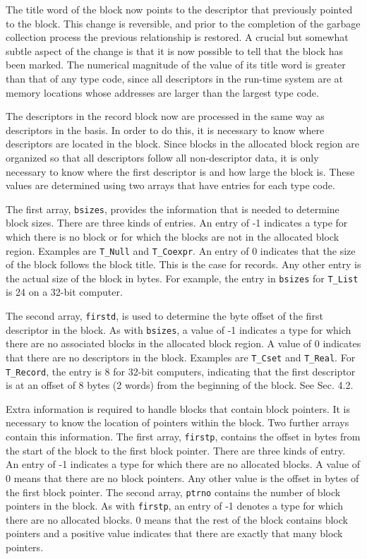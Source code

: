 The title word of the block now points to the descriptor that
previously pointed to the block. This change is reversible, and prior
to the completion of the garbage collection process the previous
relationship is restored. A crucial but somewhat subtle aspect of the
change is that it is now possible to tell that the block has been
marked. The numerical magnitude of the value of its title word is
greater than that of any type code, since all descriptors in the
run-time system are at memory locations whose addresses are larger
than the largest type code.

The descriptors in the record block now are processed in the same way
as descriptors in the basis. In order to do this, it is necessary to
know where descriptors are located in the block. Since blocks in the
allocated block region are organized so that all descriptors follow
all non-descriptor data, it is only necessary to know where the first
descriptor is and how large the block is. These values are determined
using two arrays that have entries for each type code.

The first array, \texttt{bsizes}, provides the information that is
needed to determine block sizes. There are three kinds of entries. An
entry of -1 indicates a type for which there is no block or for which
the blocks are not in the allocated block region. Examples are
\texttt{T\_Null} and \texttt{T\_Coexpr}. An entry of 0 indicates that
the size of the block follows the block title. This is the case for
records. Any other entry is the actual size of the block in bytes. For
example, the entry in \texttt{bsizes} for \texttt{T\_List} is 24 on a
32-bit computer.

The second array, \texttt{firstd}, is used to determine the byte
offset of the first descriptor in the block. As with \texttt{bsizes},
a value of -1 indicates a type for which there are no associated
blocks in the allocated block region.  A value of 0 indicates that
there are no descriptors in the block. Examples are \texttt{T\_Cset}
and \texttt{T\_Real}.  For \texttt{T\_Record}, the entry is 8 for
32-bit computers, indicating that the first descriptor is at an offset
of 8 bytes (2 words) from the beginning of the block. See Sec. 4.2.

Extra information is required to handle blocks that contain block
pointers.  It is necessary to know the location of pointers within the
block. Two further arrays contain this information.  The first array,
\texttt{firstp}, contains the offset in bytes from the start of the
block to the first block pointer. There are three kinds of entry. An
entry of -1 indicates a type for which there are no allocated
blocks. A value of 0 means that there are no block pointers. Any other
value is the offset in bytes of the first block pointer.  The second
array, \texttt{ptrno} contains the number of block pointers in the
block. As with \texttt{firstp}, an entry of -1 denotes a type for
which there are no allocated blocks.  0 means that the rest of the
block contains block pointers and a positive value indicates that there
are exactly that many block pointers.

